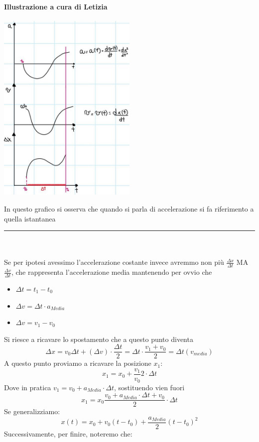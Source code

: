 \documentclass[12pt, a4paper, openany, oneside]{book}
\begin{document}
\paragraph{Illustrazione a cura di Letizia}
\begin{center}
\includegraphics[width=0.50\textwidth]{1}
\end{center}
In questo grafico si osserva che quando si parla di accelerazione si fa riferimento
a quella istantanea \\
{\color{black} \rule{\linewidth}{0.3mm} }
\\ \\ 
Se per ipotesi avessimo l'accelerazione costante invece avremmo non più 
$\frac{\Delta x}{\Delta t}$ MA $\frac{\Delta v}{\Delta t}$, che rappresenta 
l'accelerazione media mantenendo per ovvio che
\begin{itemize}
	\item $\Delta t = t_{1} - t_{0}$
	\item $\Delta v = \Delta t \cdot a_{Media}$ 
	\item $\Delta v = v_{1} - v_{0}$
\end{itemize}
Si riesce a ricavare lo spostamento che a questo punto diventa 
\[\Delta x = v_{0}\Delta t +(\Delta v) \cdot \frac{\Delta t}{2} =
\Delta t \cdot \frac{v_{1}+v_{0}}{2} = \Delta t(v_{media})\]
A questo punto proviamo a ricavare la posizione $x_{1}$:
\[x_{1} = x_{0} + \frac{v_{1}}{v_{0}}{2}\cdot \Delta t\]
Dove in pratica $v_{1} = v_{0} + a_{Media} \cdot \Delta t$, sostituendo vien fuori
\[x_{1} = x_{0} \frac{v_{0}+a_{Media}\cdot\Delta t + v_{0}}{2} \cdot \Delta t\]
Se generalizziamo:
\[x(t) = x_{0} + v_{0}(t-t_{0})+\frac{a_{Media}}{2}(t-t_{0})^{2}\]
Successivamente, per finire, noteremo che:
\end{document}

